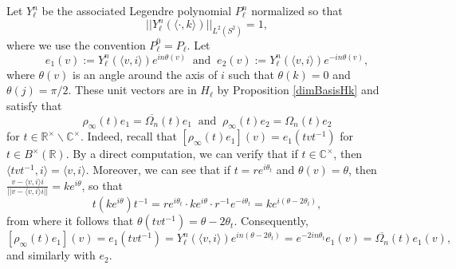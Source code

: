\documentclass[11pt]{amsart}
\newcommand{\R}{\mathbb{R}}
\newcommand{\C}{\mathbb{C}}
\theoremstyle{definition}
\theoremstyle{remark}
\begin{document}
Let $Y_{\ell}^{n}$ be the associated Legendre polynomial $P_{\ell}^{n}$ normalized so that $$||Y_{\ell}^{n}(\langle \cdot, k\rangle )||_{L^2(S^2)}=1,$$ where we use the convention $P_{\ell}^{0} = P_{\ell}$. Let $$ e_1(v) := Y_{\ell}^{n}(\langle v,i\rangle ) e^{in\theta(v)} \: \text{ and } \: e_2(v) := Y_{\ell}^{n}(\langle v,i\rangle ) e^{-in\theta(v)},$$ where $\theta(v)$ is an angle around the axis of $i$ such that $\theta(k)=0$ and $\theta(j)=\pi/2$. These unit vectors are in $H_\ell$ by Proposition \ref{dimBasisHk} and satisfy that $$ \rho_{\infty}(t)e_1 = \overline{\Omega_{n}}(t) e_1 \: \text{ and } \: \rho_{\infty}(t) e_2 = \Omega_n(t) e_2$$ for $t \in \R^{\times} \backslash \C^{\times}$. Indeed, recall that $[\rho_{\infty}(t)e_1](v) = e_1(tvt^{-1})$ for $t\in B^{\times}(\R)$. By a direct computation, we can verify that if $t\in \C^{\times}$, then $\langle tvt^{-1},i\rangle  = \langle v,i\rangle$. Moreover, we can see that if $t=re^{i\theta_t}$ and $\theta(v)=\theta$, then $\frac{v-\langle v,i\rangle i}{||v-\langle v,i\rangle i||} =  ke^{i\theta}$, so that $$ t\left(ke^{i\theta}\right)t^{-1} = re^{i\theta_t} \cdot ke^{i\theta} \cdot r^{-1} e^{-i\theta_t} = ke^{i(\theta-2\theta_t)},$$ from where it follows that $\theta(tvt^{-1}) = \theta - 2\theta_t$. Consequently, $$ [\rho_{\infty}(t)e_1](v) = e_1(tvt^{-1}) = Y_{\ell}^{n}(\langle v,i\rangle) e^{in(\theta-2\theta_t)} = e^{-2in\theta_t} e_1(v) = \overline{\Omega_{n}}(t) e_1(v),$$ and similarly with $e_2$.
\end{document}
